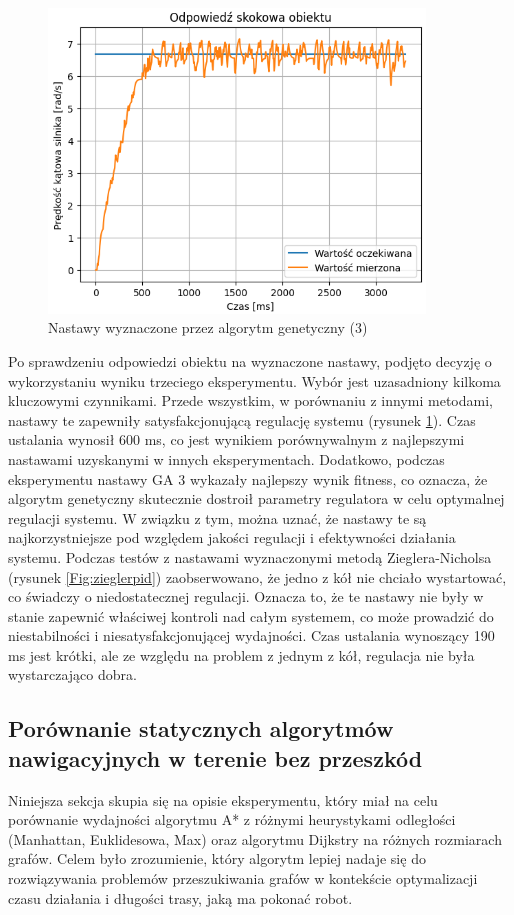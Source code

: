 \documentclass[12pt,twoside]{article}
\begin{document}
\begin{figure}[ht]%
 \centering%
 \includegraphics[width=10cm]{figures/PID/exp3pid.png}%
 \caption{Nastawy wyznaczone przez algorytm genetyczny (3)}%
 \label{Fig:exp3pid}%
\end{figure}

\clearpage

Po sprawdzeniu odpowiedzi obiektu na wyznaczone nastawy, podjęto decyzję o wykorzystaniu wyniku trzeciego eksperymentu. Wybór jest uzasadniony kilkoma kluczowymi czynnikami. Przede wszystkim, w porównaniu z innymi metodami, nastawy te zapewniły satysfakcjonującą regulację systemu (rysunek \ref{Fig:exp3pid}). Czas ustalania wynosił 600 ms, co jest wynikiem porównywalnym z najlepszymi nastawami uzyskanymi w innych eksperymentach. Dodatkowo, podczas eksperymentu nastawy GA 3 wykazały najlepszy wynik fitness, co oznacza, że algorytm genetyczny skutecznie dostroił parametry regulatora w celu optymalnej regulacji systemu. W związku z tym, można uznać, że nastawy te są najkorzystniejsze pod względem jakości regulacji i efektywności działania systemu. Podczas testów z nastawami wyznaczonymi metodą Zieglera-Nicholsa (rysunek \ref{Fig:zieglerpid}) zaobserwowano, że jedno z kół nie chciało wystartować, co świadczy o niedostatecznej regulacji. Oznacza to, że te nastawy nie były w stanie zapewnić właściwej kontroli nad całym systemem, co może prowadzić do niestabilności i niesatysfakcjonującej wydajności. Czas ustalania wynoszący 190 ms jest krótki, ale ze względu na problem z jednym z kół, regulacja nie była wystarczająco dobra.



\subsection{Porównanie statycznych algorytmów nawigacyjnych w terenie bez przeszkód}
Niniejsza sekcja skupia się na opisie eksperymentu, który miał na celu porównanie wydajności algorytmu A* z różnymi heurystykami odległości (Manhattan, Euklidesowa, Max) oraz algorytmu Dijkstry na różnych rozmiarach grafów. Celem było zrozumienie, który algorytm lepiej nadaje się do rozwiązywania problemów przeszukiwania grafów w kontekście optymalizacji czasu działania i długości trasy, jaką ma pokonać robot. 
\end{document}
